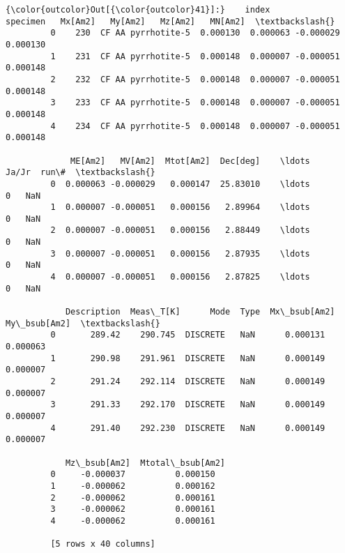 \documentclass{article}
\begin{document}
            \begin{Verbatim}[commandchars=\\\{\}]
{\color{outcolor}Out[{\color{outcolor}41}]:}    index            specimen   Mx[Am2]   My[Am2]   Mz[Am2]   MN[Am2]  \textbackslash{}
         0    230  CF AA pyrrhotite-5  0.000130  0.000063 -0.000029  0.000130   
         1    231  CF AA pyrrhotite-5  0.000148  0.000007 -0.000051  0.000148   
         2    232  CF AA pyrrhotite-5  0.000148  0.000007 -0.000051  0.000148   
         3    233  CF AA pyrrhotite-5  0.000148  0.000007 -0.000051  0.000148   
         4    234  CF AA pyrrhotite-5  0.000148  0.000007 -0.000051  0.000148   
         
             ME[Am2]   MV[Am2]  Mtot[Am2]  Dec[deg]    \ldots     Ja/Jr  run\#  \textbackslash{}
         0  0.000063 -0.000029   0.000147  25.83010    \ldots         0   NaN   
         1  0.000007 -0.000051   0.000156   2.89964    \ldots         0   NaN   
         2  0.000007 -0.000051   0.000156   2.88449    \ldots         0   NaN   
         3  0.000007 -0.000051   0.000156   2.87935    \ldots         0   NaN   
         4  0.000007 -0.000051   0.000156   2.87825    \ldots         0   NaN   
         
            Description  Meas\_T[K]      Mode  Type  Mx\_bsub[Am2]  My\_bsub[Am2]  \textbackslash{}
         0       289.42    290.745  DISCRETE   NaN      0.000131      0.000063   
         1       290.98    291.961  DISCRETE   NaN      0.000149      0.000007   
         2       291.24    292.114  DISCRETE   NaN      0.000149      0.000007   
         3       291.33    292.170  DISCRETE   NaN      0.000149      0.000007   
         4       291.40    292.230  DISCRETE   NaN      0.000149      0.000007   
         
            Mz\_bsub[Am2]  Mtotal\_bsub[Am2]  
         0     -0.000037          0.000150  
         1     -0.000062          0.000162  
         2     -0.000062          0.000161  
         3     -0.000062          0.000161  
         4     -0.000062          0.000161  
         
         [5 rows x 40 columns]
\end{Verbatim}
        
\end{document}
